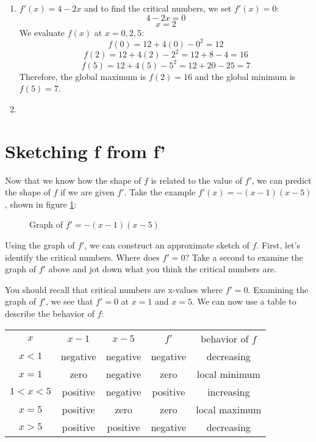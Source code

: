 \begin{Answer}[ref=gloext2]
\begin{enumerate}
	\item $f'(x) = 4-2x$ and to find the critical numbers, we set $f'(x)=0$:
$$4-2x=0$$
$$x=2$$
We evaluate $f(x)$ at $x=0, 2, 5$:
$$f(0) = 12+4(0)-0^2=12$$
$$f(2) = 12+4(2)-2^2=12+8-4=16$$
$$f(5) = 12+4(5)-5^2=12+20-25=7$$
Therefore, the global maximum is $f(2) = 16$ and the global minimum is $f(5) = 7$.
\item %
\end{enumerate}
\end{Answer}

\section{Sketching f from f'}
Now that we know how the shape of $f$ is related to the value of $f'$, we can 
predict the shape of $f$ if we are given $f'$. Take the example $f'(x) = -(x-1)
(x-5)$, shown in figure \ref{fig:sketchf1}:

\begin{figure}[htbp]
	\centering
	\caption{Graph of $f'=-(x-1)(x-5)$}
	\label{fig:sketchf1}
\end{figure}

Using the graph of $f'$, we can construct an approximate sketch of $f$. First, 
let's identify the critical numbers. Where does $f'=0$? Take a second to 
examine the graph of $f'$ above and jot down what you think the critical 
numbers are.

You should recall that critical numbers are x-values where $f'=0$. Examining 
the graph of $f'$, we see that $f'=0$ at $x=1$ and $x=5$. We can now use a 
table to describe the behavior of $f$:

\begin{tabular}{c|c|c|c|c}
$x$ & $x-1$ & $x-5$ & $f'$ & behavior of $f$\\
$x<1$ & negative & negative & negative & decreasing\\
$x=1$ & zero & negative & zero & local minimum\\
$1<x<5$ & positive & negative & positive & increasing\\
$x=5$ & positive & zero & zero & local maximum\\
$x>5$ & positive & positive & negative & decreasing\\
\end{tabular}

